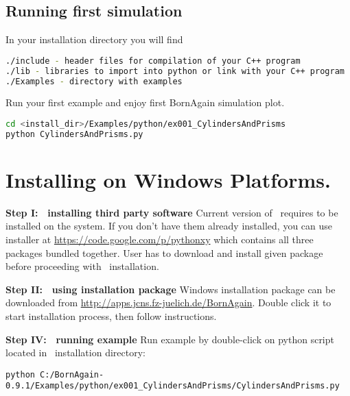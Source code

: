 \subsection{Running first simulation}

In your installation directory you will find
\begin{lstlisting}[language=bash, style=commandline]
./include - header files for compilation of your C++ program
./lib - libraries to import into python or link with your C++ program
./Examples - directory with examples
\end{lstlisting}

Run your first example and enjoy first BornAgain simulation plot.
\begin{lstlisting}[language=bash, style=commandline]
cd <install_dir>/Examples/python/ex001_CylindersAndPrisms
python CylindersAndPrisms.py
\end{lstlisting}




\section{Installing on Windows Platforms.} 


\noindent
{\bf Step I: $~$ installing third party software} \newline
Current version of \BornAgain\ requires  
to be installed on the system. If you don't have them already installed,
you can use  installer
at \url{https://code.google.com/p/pythonxy} which contains all three packages bundled
together. User has to download and install given package before proceeding with
\BornAgain\ installation.
\vspace*{2mm}

\noindent
{\bf Step II: $~$ using installation package } \newline
Windows installation package can be downloaded from \url{http://apps.jcns.fz-juelich.de/BornAgain}.
Double click it to start installation process, then follow instructions.
\vspace*{2mm}

\noindent
{\bf Step IV: $~$ running example} \newline
Run example by double-click on python script located in \BornAgain\ installation directory:
\begin{lstlisting}[language=shell, style=commandline]
python C:/BornAgain-0.9.1/Examples/python/ex001_CylindersAndPrisms/CylindersAndPrisms.py
\end{lstlisting}





